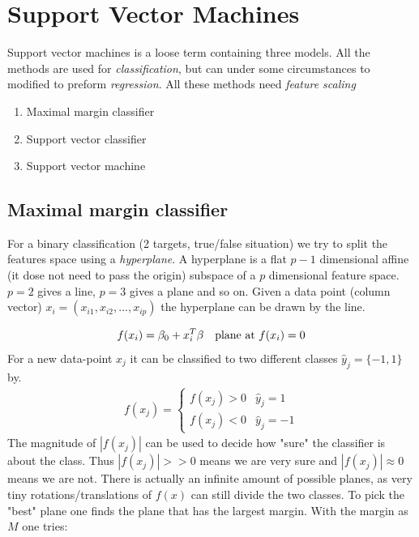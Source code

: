 \documentclass{article}
\begin{document}
\section{Support Vector Machines}
Support vector machines is a loose term containing three models. All the methods are used for \textit{classification}, but can under some circumstances to modified to preform \textit{regression}. All these methods need \textit{feature scaling}  

\begin{enumerate}
    \item Maximal margin classifier
    \item Support vector classifier 
    \item Support vector machine
\end{enumerate}

\subsection{Maximal margin classifier}
For a binary classification (2 targets, true/false situation) we try to split the features space using a \textit{hyperplane}. A hyperplane is a flat $p-1$ dimensional affine (it dose not need to pass the origin) subspace of a $p$ dimensional feature space. $p=2$ gives a line, $p=3$ gives a plane and so on. Given a data point (column vector) $x_i = (x_{i1}, x_{i2}, ... , x_{ip})$ the hyperplane can be drawn by the line.

\begin{align*}
     f(x_i) = \beta_0 + x_i^T \beta \hspace{10px}\text{plane at } f(x_i) = 0
\end{align*}
For a new data-point $x_j$ it can be classified to two different classes $\hat{y}_j = \{-1, 1\}$ by. 
\begin{align*}
    f(x_j) = \begin{cases}
    f(x_j) > 0 & \hat{y}_j = 1 \\
    f(x_j) < 0 & \hat{y}_j = -1
    \end{cases}
\end{align*}
The magnitude of $|f(x_j)|$ can be used to decide how "sure" the classifier is about the class. Thus $|f(x_j)| >> 0$ means we are very sure and $|f(x_j)| \approx 0$ means we are not. There is actually an infinite amount of possible planes, as very tiny rotations/translations of $f(x)$ can still divide the two classes. To pick the "best" plane one finds the plane that has the largest margin. With the margin as $M$ one tries:
\end{document}
